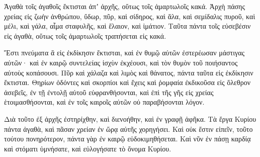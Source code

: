 {Ἀγαθὰ τοῖς ἀγαθοῖς ἔκτισται ἀπʼ ἀρχῆς, οὕτως τοῖς ἁμαρτωλοῖς κακά.
Ἀρχὴ πάσης χρείας εἰς ζωὴν ἀνθρώπου, ὕδωρ, πῦρ, καὶ σίδηρος, καὶ ἅλα, καὶ σεμίδαλις πυροῦ, καὶ μέλι, καὶ γάλα, αἷμα σταφυλῆς, καὶ ἔλαιον, καὶ ἱμάτιον.
Ταῦτα πάντα τοῖς εὐσεβέσιν εἰς ἀγαθὰ, οὕτως τοῖς ἁμαρτωλοῖς τραπήσεται εἰς κακά.
\par }{\PP {}Ἔστι πνεύματα ἃ εἰς ἐκδίκησιν ἔκτισται, καὶ ἐν θυμῷ αὐτῶν ἐστερέωσαν μάστιγας αὐτῶν· καὶ ἐν καιρῷ συντελείας ἰσχὺν ἐκχέουσι, καὶ τὸν θυμὸν τοῦ ποιήσαντος αὐτοὺς κοπάσουσι.
Πῦρ καὶ χάλαζα καὶ λιμὸς καὶ θάνατος, πάντα ταῦτα εἰς ἐκδίκησιν ἔκτισται.
Θηρίων ὁδόντες καὶ σκορπίοι καὶ ἔχεις καὶ ῥομφαία ἐκδικοῦσα εἰς ὄλεθρον ἀσεβεῖς,
ἐν τῇ ἐντολῇ αὐτοῦ εὐφρανθήσονται, καὶ ἐπὶ τῆς γῆς εἰς χρείας ἑτοιμασθήσονται, καὶ ἐν τοῖς καιροῖς αὐτῶν οὐ παραβήσονται λόγον.
\par }{\PP {}Διὰ τοῦτο ἐξ ἀρχῆς ἐστηρίχθην, καὶ διενοήθην, καὶ ἐν γραφῇ ἀφῆκα.
Τὰ ἔργα Κυρίου πάντα ἀγαθὰ, καὶ πᾶσαν χρείαν ἐν ὥρᾳ αὐτῆς χορηγήσει.
Καὶ οὐκ ἔστιν εἰπεῖν, τοῦτο τούτου πονηρότερον, πάντα γὰρ ἐν καιρῷ εὐδοκιμηθήσεται.
Καὶ νῦν ἐν πάσῃ καρδίᾳ καὶ στόματι ὑμνήσατε, καὶ εὐλογήσατε τὸ ὄνομα Κυρίου.

}
